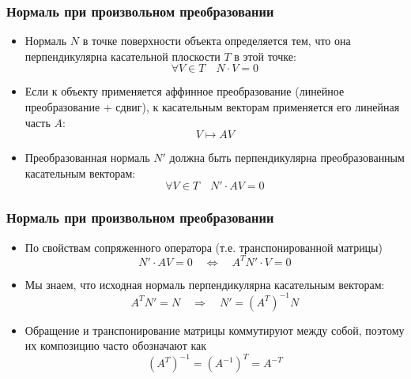 \documentclass[10pt]{beamer}
\begin{document}
\begin{frame}[fragile]
\frametitle{Нормаль при произвольном преобразовании}
\begin{itemize}
\item Нормаль \begin{math}N\end{math} в точке поверхности объекта определяется тем, что она перпендикулярна касательной плоскости \begin{math}T\end{math} в этой точке:
\begin{equation*}
\forall V \in T \quad N\cdot V = 0
\end{equation*}
\pause
\item Если к объекту применяется аффинное преобразование (линейное преобразование + сдвиг), к касательным векторам применяется его линейная часть \begin{math}A\end{math}:
\begin{equation*}
V \mapsto AV
\end{equation*}
\pause
\item Преобразованная нормаль \begin{math}N'\end{math} должна быть перпендикулярна преобразованным касательным векторам:
\begin{equation*}
\forall V \in T \quad N'\cdot AV = 0
\end{equation*}
\end{itemize}
\end{frame}

\begin{frame}[fragile]
\frametitle{Нормаль при произвольном преобразовании}
\begin{itemize}
\item По свойствам сопряженного оператора (т.е. транспонированной матрицы)
\begin{equation*}
N'\cdot AV = 0 \quad \Longleftrightarrow \quad A^{T}N' \cdot V = 0
\end{equation*}
\pause
\item Мы знаем, что исходная нормаль перпендикулярна касательным векторам:
\begin{equation*}
A^{T}N' = N \quad\Longrightarrow\quad N' = (A^T)^{-1} N
\end{equation*}
\pause
\item Обращение и транспонирование матрицы коммутируют между собой, поэтому их композицию часто обозначают как
\begin{equation*}
(A^T)^{-1} = (A^{-1})^T = A^{-T}
\end{equation*}
\end{itemize}
\end{frame}
\end{document}
